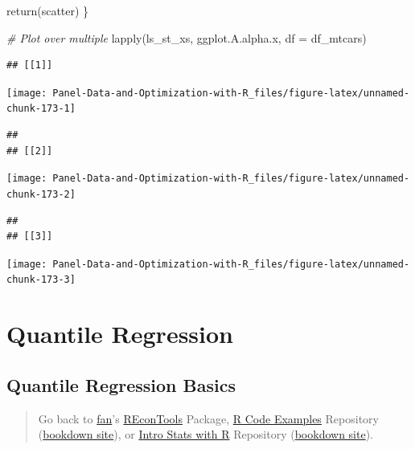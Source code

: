 \documentclass[
]{book}
\newenvironment{Shaded}{\begin{snugshade}}{\end{snugshade}}
\newcommand{\AttributeTok}[1]{\textcolor[rgb]{0.77,0.63,0.00}{#1}}
\newcommand{\CommentTok}[1]{\textcolor[rgb]{0.56,0.35,0.01}{\textit{#1}}}
\newcommand{\FunctionTok}[1]{\textcolor[rgb]{0.00,0.00,0.00}{#1}}
\newcommand{\NormalTok}[1]{#1}
\begin{document}
\begin{Shaded}
\begin{Highlighting}[]
\FunctionTok{return}\NormalTok{(scatter)}
\NormalTok{\}}

\CommentTok{\# Plot over multiple}
\FunctionTok{lapply}\NormalTok{(ls\_st\_xs,}
\NormalTok{       ggplot.A.alpha.x,}
       \AttributeTok{df =}\NormalTok{ df\_mtcars)}
\end{Highlighting}
\end{Shaded}

\begin{verbatim}
## [[1]]
\end{verbatim}

\begin{center}\texttt{[image: Panel-Data-and-Optimization-with-R\_files/figure-latex/unnamed-chunk-173-1]} \end{center}

\begin{verbatim}
## 
## [[2]]
\end{verbatim}

\begin{center}\texttt{[image: Panel-Data-and-Optimization-with-R\_files/figure-latex/unnamed-chunk-173-2]} \end{center}

\begin{verbatim}
## 
## [[3]]
\end{verbatim}

\begin{center}\texttt{[image: Panel-Data-and-Optimization-with-R\_files/figure-latex/unnamed-chunk-173-3]} \end{center}

\hypertarget{quantile-regression}{%
\section{Quantile Regression}\label{quantile-regression}}

\hypertarget{quantile-regression-basics}{%
\subsection{Quantile Regression Basics}\label{quantile-regression-basics}}

\begin{quote}
Go back to \href{http://fanwangecon.github.io/}{fan}'s \href{https://fanwangecon.github.io/REconTools/}{REconTools} Package, \href{https://fanwangecon.github.io/R4Econ/}{R Code Examples} Repository (\href{https://fanwangecon.github.io/R4Econ/bookdown}{bookdown site}), or \href{https://fanwangecon.github.io/Stat4Econ/}{Intro Stats with R} Repository (\href{https://fanwangecon.github.io/Stat4Econ/bookdown}{bookdown site}).
\end{quote}
\end{document}
